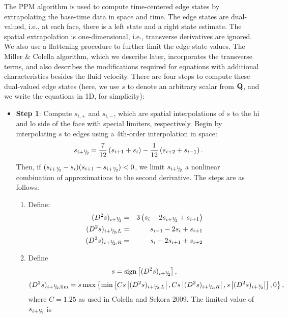 The PPM algorithm is used to compute time-centered edge states by
extrapolating the base-time data in space and time.  The edge states
are dual-valued, i.e., at each face, there is a left state and a right
state estimate.  The spatial extrapolation is one-dimensional, i.e.,
transverse derivatives are ignored.  We also use a flattening
procedure to further limit the edge state values.  The Miller \&
Colella algorithm, which we describe later, incorporates the
transverse terms, and also describes the modifications required for
equations with additional characteristics besides the fluid velocity.
There are four steps to compute these dual-valued edge states (here,
we use $s$ to denote an arbitrary scalar from ${\bf Q}$, and we write the
equations in 1D, for simplicity):
\begin{itemize}
\item {\bf Step 1}: Compute $s_{i,+}$ and $s_{i,-}$, which are spatial
  interpolations of $s$ to the hi and lo side of the face with special
  limiters, respectively.  Begin by interpolating $s$ to edges using a
  4th-order interpolation in space:
\begin{equation}
s_{i+\myhalf} = \frac{7}{12}\left(s_{i+1}+s_i\right) - \frac{1}{12}\left(s_{i+2}+s_{i-1}\right).
\end{equation}
Then, if $(s_{i+\myhalf}-s_i)(s_{i+1}-s_{i+\myhalf}) < 0$, we limit
$s_{i+\myhalf}$ a nonlinear combination of approximations to the
second derivative.  The steps are as follows:
\begin{enumerate}
\item Define:
\begin{eqnarray}
(D^2s)_{i+\myhalf} &=& 3\left(s_{i}-2s_{i+\myhalf}+s_{i+1}\right) \\
(D^2s)_{i+\myhalf,L} &=& s_{i-1}-2s_{i}+s_{i+1} \\
(D^2s)_{i+\myhalf,R} &=& s_{i}-2s_{i+1}+s_{i+2}
\end{eqnarray}
\item Define
\begin{equation}
s = \text{sign}\left[(D^2s)_{i+\myhalf}\right],
\end{equation}
\begin{equation}
(D^2s)_{i+\myhalf,\text{lim}} = s\max\left\{\min\left[Cs\left|(D^2s)_{i+\myhalf,L}\right|,Cs\left|(D^2s)_{i+\myhalf,R}\right|,s\left|(D^2s)_{i+\myhalf}\right|\right],0\right\},
\end{equation}
where $C=1.25$ as used in Colella and Sekora 2009.  The limited value
of $s_{i+\myhalf}$ is
\begin{equation}

\end{equation}
\end{enumerate}
\end{itemize}
